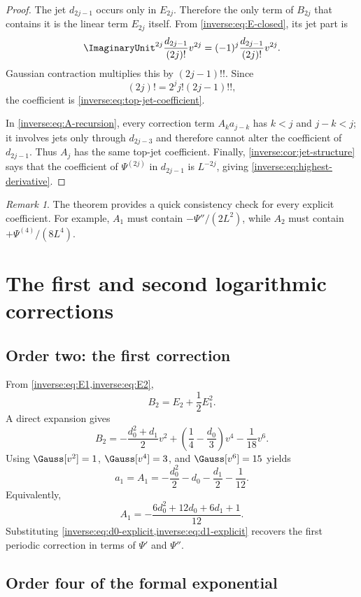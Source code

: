 \documentclass[11pt,oneside]{article}
\theoremstyle{definition}
\theoremstyle{remark}
\newtheorem{remark}[remark]{Remark}
\begin{document}
\begin{proof}
The jet $d_{2j-1}$ occurs only in $E_{2j}$.  Therefore the only term of
$B_{2j}$ that contains it is the linear term $E_{2j}$ itself.  From
\eqref{inverse:eq:E-closed}, its jet part is
\[
 \ImaginaryUnit^{2j}\frac{d_{2j-1}}{(2j)!}v^{2j}
 =(-1)^j\frac{d_{2j-1}}{(2j)!}v^{2j}.
\]
Gaussian contraction multiplies this by $(2j-1)!!$.  Since
\[
 (2j)!=2^jj!(2j-1)!!,
\]
the coefficient is \eqref{inverse:eq:top-jet-coefficient}.

In \eqref{inverse:eq:A-recursion}, every correction term
$A_ka_{j-k}$ has $k<j$ and $j-k<j$; it involves jets only through
$d_{2j-3}$ and therefore cannot alter the coefficient of $d_{2j-1}$.
Thus $A_j$ has the same top-jet coefficient.  Finally,
\cref{inverse:cor:jet-structure} says that the coefficient of
$\Psi^{(2j)}$ in $d_{2j-1}$ is $L^{-2j}$, giving
\eqref{inverse:eq:highest-derivative}.
\end{proof}

\begin{remark}
The theorem provides a quick consistency check for every explicit
coefficient.  For example, $A_1$ must contain
$-\Psi''/(2L^2)$, while $A_2$ must contain
$+\Psi^{(4)}/(8L^4)$.
\end{remark}

\section{The first and second logarithmic corrections}
\label{inverse:sec:second-correction}

\subsection{Order two: the first correction}

From \cref{inverse:eq:E1,inverse:eq:E2},
\[
 B_2=E_2+\frac12E_1^2.
\]
A direct expansion gives
\[
 B_2
 =-\frac{d_0^2+d_1}{2}v^2
   +\left(\frac14-\frac{d_0}{3}\right)v^4
   -\frac1{18}v^6.
\]
Using $\Gauss[v^2]=1$, $\Gauss[v^4]=3$, and
$\Gauss[v^6]=15$ yields
\begin{equation}
 a_1=A_1
 =-\frac{d_0^2}{2}-d_0-\frac{d_1}{2}-\frac1{12}.
 \label{inverse:eq:A1-jets}
\end{equation}
Equivalently,
\[
 A_1=-\frac{6d_0^2+12d_0+6d_1+1}{12}.
\]
Substituting \cref{inverse:eq:d0-explicit,inverse:eq:d1-explicit} recovers the first
periodic correction in terms of $\Psi'$ and $\Psi''$.

\subsection{Order four of the formal exponential}
\end{document}
